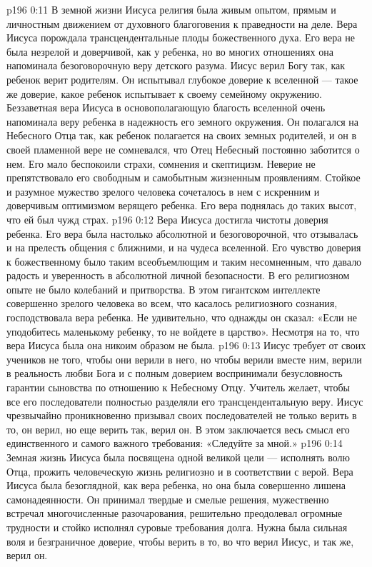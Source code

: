 \vs p196 0:11 В земной жизни Иисуса религия была живым опытом, прямым и личностным движением от духовного благоговения к праведности на деле. Вера Иисуса порождала трансцендентальные плоды божественного духа. Его вера не была незрелой и доверчивой, как у ребенка, но во многих отношениях она напоминала безоговорочную веру детского разума. Иисус верил Богу так, как ребенок верит родителям. Он испытывал глубокое доверие к вселенной --- такое же доверие, какое ребенок испытывает к своему семейному окружению. Беззаветная вера Иисуса в основополагающую благость вселенной очень напоминала веру ребенка в надежность его земного окружения. Он полагался на Небесного Отца так, как ребенок полагается на своих земных родителей, и он в своей пламенной вере не сомневался, что Отец Небесный постоянно заботится о нем. Его мало беспокоили страхи, сомнения и скептицизм. Неверие не препятствовало его свободным и самобытным жизненным проявлениям. Стойкое и разумное мужество зрелого человека сочеталось в нем с искренним и доверчивым оптимизмом верящего ребенка. Его вера поднялась до таких высот, что ей был чужд страх.
\vs p196 0:12 Вера Иисуса достигла чистоты доверия ребенка. Его вера была настолько абсолютной и безоговорочной, что отзывалась и на прелесть общения с ближними, и на чудеса вселенной. Его чувство доверия к божественному было таким всеобъемлющим и таким несомненным, что давало радость и уверенность в абсолютной личной безопасности. В его религиозном опыте не было колебаний и притворства. В этом гигантском интеллекте совершенно зрелого человека во всем, что касалось религиозного сознания, господствовала вера ребенка. Не удивительно, что однажды он сказал: «Если не уподобитесь маленькому ребенку, то не войдете в царство». Несмотря на то, что вера Иисуса была   она никоим образом не была.
\vs p196 0:13 Иисус требует от своих учеников не того, чтобы они верили в него, но чтобы верили вместе  ним, верили в реальность любви Бога и с полным доверием воспринимали безусловность гарантии сыновства по отношению к Небесному Отцу. Учитель желает, чтобы все его последователи полностью разделяли его трансцендентальную веру. Иисус чрезвычайно проникновенно призывал своих последователей не только верить в то,  он верил, но еще верить так,  верил он. В этом заключается весь смысл его единственного и самого важного требования: «Следуйте за мной.»
\vs p196 0:14 Земная жизнь Иисуса была посвящена одной великой цели --- исполнять волю Отца, прожить человеческую жизнь религиозно и в соответствии с верой. Вера Иисуса была безоглядной, как вера ребенка, но она была совершенно лишена самонадеянности. Он принимал твердые и смелые решения, мужественно встречал многочисленные разочарования, решительно преодолевал огромные трудности и стойко исполнял суровые требования долга. Нужна была сильная воля и безграничное доверие, чтобы верить в то, во что верил Иисус, и так же,  верил он.
